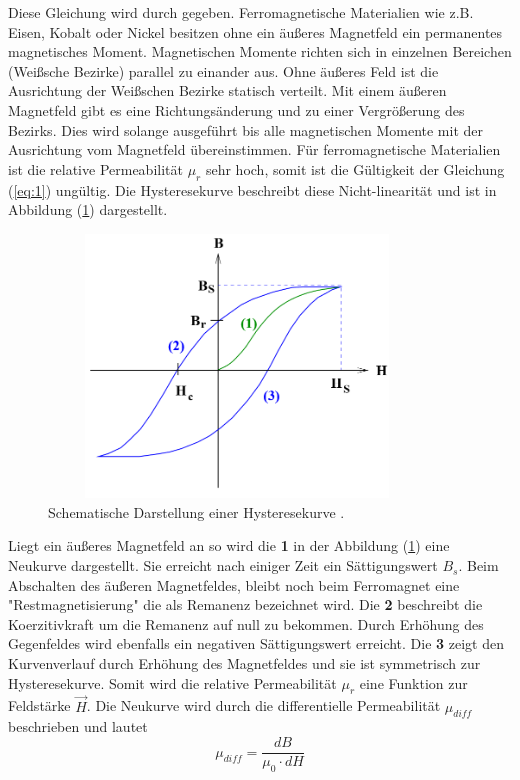Diese Gleichung wird durch \cite{3} gegeben.
Ferromagnetische Materialien wie z.B. Eisen, Kobalt oder Nickel besitzen ohne ein äußeres Magnetfeld
ein permanentes magnetisches Moment. Magnetischen Momente richten sich in einzelnen Bereichen (Weißsche Bezirke)
parallel zu einander aus. Ohne äußeres Feld ist die Ausrichtung der Weißschen Bezirke statisch verteilt.
Mit einem äußeren Magnetfeld gibt es eine Richtungsänderung und zu einer Vergrößerung des Bezirks.
Dies wird solange ausgeführt bis alle magnetischen Momente mit der Ausrichtung vom Magnetfeld übereinstimmen.
Für ferromagnetische Materialien ist die relative Permeabilität $\mu_r$ sehr hoch, somit ist die Gültigkeit der
Gleichung (\ref{eq:1}) ungültig.
Die Hysteresekurve beschreibt diese Nicht-linearität und ist in Abbildung (\ref{abb:3}) dargestellt.
\begin{figure}[H]
  \centering
  \includegraphics[width=10cm, height= 7cm]{Abb3.png}
  \caption{Schematische Darstellung einer Hysteresekurve \cite{1}.}
  \label{abb:3}
\end{figure}
Liegt ein äußeres Magnetfeld an so wird die \textbf{1} in der Abbildung (\ref{abb:3}) eine
Neukurve dargestellt. Sie erreicht nach einiger Zeit ein Sättigungswert $B_s$. Beim Abschalten
des äußeren Magnetfeldes, bleibt noch beim Ferromagnet eine "Restmagnetisierung" die
als Remanenz bezeichnet wird. Die \textbf{2} beschreibt die Koerzitivkraft um die Remanenz auf null zu bekommen.
Durch Erhöhung des Gegenfeldes wird ebenfalls ein negativen Sättigungswert erreicht.
Die \textbf{3} zeigt den Kurvenverlauf durch Erhöhung des Magnetfeldes und sie ist symmetrisch zur Hysteresekurve.
Somit wird die relative Permeabilität $\mu_r$ eine Funktion zur Feldstärke $\vec{H}$.
Die Neukurve wird durch die differentielle Permeabilität $\mu_{diff}$ beschrieben und lautet
\begin{equation*}
  \mu_{diff} = \frac{dB}{\mu_0 \cdot dH}
  \label{eq:6}
\end{equation*}
